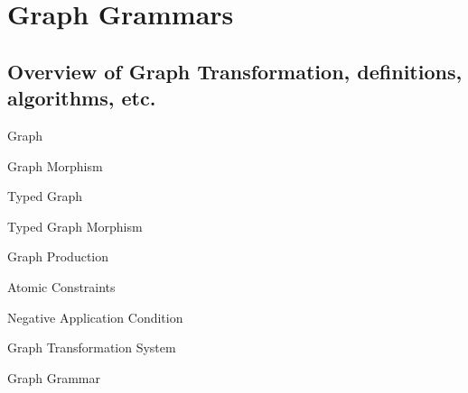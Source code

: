 \chapter{Graph Grammars}

\section{Overview of Graph Transformation, definitions, algorithms, etc.}

\begin{intuition}
\end{intuition}

\begin{mydef}{Graph}
\end{mydef}

\begin{mydef}{Graph Morphism}
\end{mydef}

\begin{mydef}{Typed Graph}
\end{mydef}

\begin{mydef}{Typed Graph Morphism}
\end{mydef}


\begin{mydef}{Graph Production}
\end{mydef}

\begin{mydef}{Atomic Constraints}


\end{mydef}

\begin{mydef}{Negative Application Condition}


\end{mydef}

\begin{mydef}{Graph Transformation System}
\end{mydef}

\begin{mydef}{Graph Grammar}
\end{mydef}

